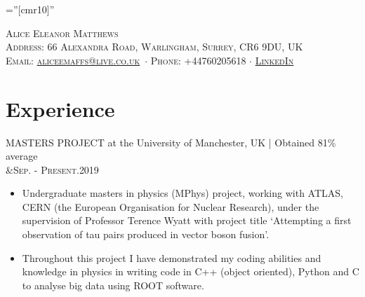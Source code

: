 \documentclass[a4paper,10pt]{article}
\newcommand{\namestyle}{\Huge \scshape}
\newcommand{\addressstyle}{\color{addresscolor} \footnotesize \rmfamily \upshape}
\begin{document}

\pagestyle{empty} %

\font\fb=''[cmr10]'' %

\par{\centering
		{\namestyle{\Huge{Alice Eleanor Matthews}}\\[0.2em]
\addressstyle Address: 66 Alexandra Road, Warlingham, Surrey, CR6 9DU, UK \\
Email: \href{mailto:aliceemaffs@live.co.uk}{aliceemaffs@live.co.uk}\ $\cdot$  Phone: +44760205618 $\cdot$ \href{https://www.linkedin.com/in/alice-matthews-a82616111/}{LinkedIn}\\	}\bigskip\par}



\section{Experience}
MASTERS PROJECT at the University of Manchester, UK | Obtained 81\% average\\
&\textsc{Sep. - Present.}\textsc{2019}

\begin{itemize}[leftmargin=*,topsep=0pt,noitemsep,parsep=0pt,partopsep=0pt,rightmargin=0.2cm]
\setlength\itemsep{0em}

 \item Undergraduate masters in physics (MPhys) project, working with ATLAS, CERN (the European Organisation for Nuclear Research), under the supervision of Professor Terence Wyatt with project title `Attempting a first observation of tau pairs produced in vector boson fusion'.
 
 \item Throughout this project I have demonstrated my coding abilities and knowledge in physics in writing code in C++ (object oriented), Python and C to analyse big data using ROOT software.


\end{itemize}
\end{document}
